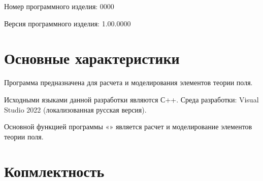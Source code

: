 \documentclass[14pt,a4paper,final]{extreport}
\begin{document}
Номер программного изделия: 0000\variant

Версия программного изделия: 1.00.0000

\chapter{Основные характеристики}

Программа предназначена для расчета и моделирования элементов теории поля.

Исходными языками данной разработки являются С++. Среда разработки: Visual Studio 2022 (локализованная русская версия).

Основной функцией программы «\programtitle» является расчет и моделирование элементов теории поля.

\newpage

\chapter{Копмлектность}
\end{document}
